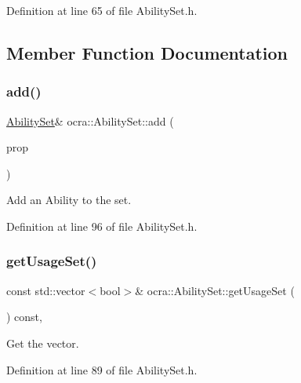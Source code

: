 Definition at line 65 of file Ability\+Set.\+h.



\subsection{Member Function Documentation}
\hypertarget{classocra_1_1AbilitySet_a4ce141c59ed38f812a4216730a0c4685}{}\label{classocra_1_1AbilitySet_a4ce141c59ed38f812a4216730a0c4685} 
\subsubsection{\texorpdfstring{add()}{add()}}
{\footnotesize\ttfamily \hyperlink{classocra_1_1AbilitySet}{Ability\+Set}\& ocra\+::\+Ability\+Set\+::add (\begin{DoxyParamCaption}\item[{\hyperlink{namespaceocra_a40ddbec106a6034cd2047bba9945b568}{e\+Function\+Ability}}]{prop }\end{DoxyParamCaption})\hspace{0.3cm}{\ttfamily [inline]}}

Add an Ability to the set. 

Definition at line 96 of file Ability\+Set.\+h.

\hypertarget{classocra_1_1AbilitySet_addb35b29c0ee151a0f93affde52a5570}{}\label{classocra_1_1AbilitySet_addb35b29c0ee151a0f93affde52a5570} 
\subsubsection{\texorpdfstring{get\+Usage\+Set()}{getUsageSet()}}
{\footnotesize\ttfamily const std\+::vector$<$bool$>$\& ocra\+::\+Ability\+Set\+::get\+Usage\+Set (\begin{DoxyParamCaption}{ }\end{DoxyParamCaption}) const\hspace{0.3cm}{\ttfamily [inline]}, {\ttfamily [protected]}}

Get the vector. 

Definition at line 89 of file Ability\+Set.\+h.

\hypertarget{classocra_1_1AbilitySet_a093633f29e0d5e6a388d9b8cba9224c7}{}\label{classocra_1_1AbilitySet_a093633f29e0d5e6a388d9b8cba9224c7} 

